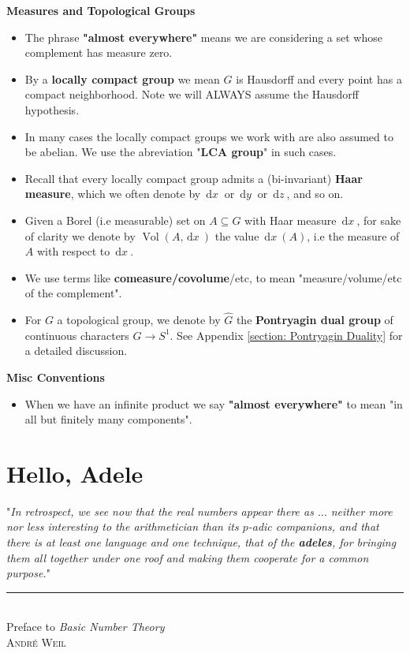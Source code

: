 \documentclass[11pt, x11names, openany]{book}
\renewcommand{\hat}{\widehat}
\newcommand{\dx}{\, \mathrm{d}x \ }
\newcommand{\dy}{\, \mathrm{d}y \ }
\newcommand{\dz}{\, \mathrm{d}z \ }
\DeclareMathOperator{\vol}{Vol}
\newenvironment{myquote}[3]
{
    \begin{flushright}
    \begin{adjustwidth}{0.125\textwidth}{}
    "\textit{\small #1}"\\
    \end{adjustwidth}
    \rule{.75\linewidth}{0.5pt}\\
    #2\\ \textsc{#3}

}
{
    \end{flushright}
}
\begin{document}
\textbf{Measures and Topological Groups}
\begin{itemize}
    \item The phrase \textbf{"almost everywhere"} means we are considering a set whose complement has measure zero.
    \item By a \textbf{locally compact group} we mean $G$ is Hausdorff and every point has a compact neighborhood. Note we will ALWAYS assume the Hausdorff hypothesis.
    \item In many cases the locally compact groups we work with are also assumed to be abelian. We use the abreviation "\textbf{LCA group}" in such cases.
    \item Recall that every locally compact group admits a (bi-invariant) \textbf{Haar measure}, which we often denote by $\dx$ or $\dy$ or $\dz$, and so on.
    \item Given a Borel (i.e measurable) set on $A \subseteq G$ with Haar measure $\dx$, for sake of clarity we denote by $\vol(A, \dx)$ the value $\dx(A)$, i.e the measure of $A$ with respect to $\dx$.
    \item We use terms like \textbf{comeasure/covolume}/etc, to mean "measure/volume/etc of the complement".
    \item For $G$ a topological group, we denote by $\hat{G}$ the \textbf{Pontryagin dual group} of continuous characters $G \to S^1$. See Appendix \ref{section: Pontryagin Duality} for a detailed discussion.
\end{itemize}

\textbf{Misc Conventions}
\begin{itemize}
    \item When we have an infinite product we say \textbf{"almost everywhere"} to mean "in all but finitely many components".
\end{itemize}



\chapter{Hello, Adele}
\label{chapter: Hello, Adele}

\begin{myquote}{In retrospect, we see now that the real numbers appear there as $\ldots$ neither more nor less interesting to the arithmetician than its $p$-adic companions, and that there is at least one language and one technique, that of the \textbf{adeles}, for bringing them all together under one roof and making them cooperate for a common purpose.}{Preface to \textit{Basic Number Theory}}{Andr\'e Weil}

\end{myquote}
\end{document}
